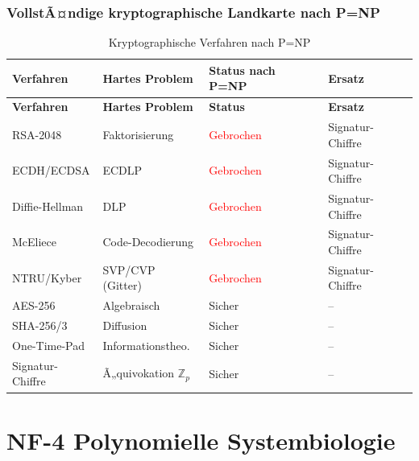 ﻿\documentclass[a4paper,12pt]{scrreprt}
\theoremstyle{definition}
\begin{document}
\section{VollstÃ¤ndige kryptographische Landkarte nach P=NP}

\begin{longtable}{p{3.5cm}p{3cm}p{4.5cm}p{3cm}}
\caption{Kryptographische Verfahren nach P=NP}
\label{tab:nf3_krypto}\\
\toprule
\textbf{Verfahren} & \textbf{Hartes Problem} & \textbf{Status nach P=NP} & \textbf{Ersatz} \\
\midrule
\endfirsthead
\toprule
\textbf{Verfahren} & \textbf{Hartes Problem} & \textbf{Status} & \textbf{Ersatz} \\
\midrule
\endhead
\bottomrule
\endfoot
RSA-2048        & Faktorisierung    & \textcolor{red}{Gebrochen}  & Signatur-Chiffre \\
ECDH/ECDSA      & ECDLP             & \textcolor{red}{Gebrochen}  & Signatur-Chiffre \\
Diffie-Hellman  & DLP               & \textcolor{red}{Gebrochen}  & Signatur-Chiffre \\
McEliece        & Code-Decodierung  & \textcolor{red}{Gebrochen}  & Signatur-Chiffre \\
NTRU/Kyber      & SVP/CVP (Gitter)  & \textcolor{red}{Gebrochen}  & Signatur-Chiffre \\
AES-256         & Algebraisch       & \textcolor{green!60!black}{Sicher} & -- \\
SHA-256/3       & Diffusion         & \textcolor{green!60!black}{Sicher} & -- \\
One-Time-Pad    & Informationstheo. & \textcolor{green!60!black}{Sicher} & -- \\
Signatur-Chiffre & Ã„quivokation $\mathbb{Z}_p$ & \textcolor{green!60!black}{Sicher} & -- \\
\end{longtable}

\part{NF-4 \quad Polynomielle Systembiologie}
\label{part:nf4}
\end{document}
